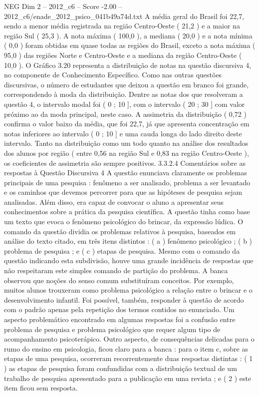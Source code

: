 \begin{textsample}{NEG Dim 2 – 2012\_c6 – Score -2.00 – 2012\_c6/enade\_2012\_psico\_041b49a74d.txt}
A média geral do Brasil foi 22,7, sendo a menor média registrada na região Centro-Oeste ( 21,2 ) e a maior na região Sul ( 25,3 ).
A nota máxima ( 100,0 ), a mediana ( 20,0 ) e a nota mínima ( 0,0 ) foram obtidas em quase todas as regiões do Brasil, exceto a nota máxima ( 95,0 ) das regiões Norte e Centro-Oeste e a mediana da região Centro-Oeste ( 10,0 ).
O Gráfico 3.20 representa a distribuição de notas na questão discursiva 4, no componente de Conhecimento Específico.
Como nas outras questões discursivas, o número de estudantes que deixou a questão em branco foi grande, correspondendo à moda da distribuição.
Dentre as notas dos que resolveram a questão 4, o intervalo modal foi ( 0 ; 10 ], com o intervalo ( 20 ; 30 ] com valor próximo ao da moda principal, neste caso.
A assimetria da distribuição ( 0,72 ) confirma o valor baixo da média, que foi 22,7, já que apresenta concentração em notas inferiores ao intervalo ( 0 ; 10 ] e uma cauda longa do lado direito deste intervalo.
Tanto na distribuição como um todo quanto na análise dos resultados dos alunos por região ( entre 0,56 na região Sul e 0,83 na região Centro-Oeste ), os coeficientes de assimetria são sempre positivos. 3.3.2.4 Comentários sobre as respostas à Questão Discursiva 4 A questão enunciava claramente os problemas principais de uma pesquisa : fenômeno a ser analisado, problema a ser levantado e os caminhos que devemos percorrer para que as hipóteses de pesquisa sejam analisadas.
Além disso, era capaz de convocar o aluno a apresentar seus conhecimentos sobre a prática da pesquisa científica.
A questão tinha como base um texto que evoca o fenômeno psicológico do brincar, da expressão lúdica.
O comando da questão dividia os problemas relativos à pesquisa, baseados em análise do texto citado, em três itens distintos : ( a ) fenômeno psicológico ; ( b ) problema de pesquisa ; e ( c ) etapas de pesquisa.
Mesmo com o comando da questão indicando esta subdivisão, houve uma grande incidência de respostas que não respeitaram este simples comando de partição do problema.
A banca observou que noções do senso comum substituíram conceitos.
Por exemplo, muitos alunos trouxeram como problema psicológico a relação entre o brincar e o desenvolvimento infantil.
Foi possível, também, responder à questão de acordo com o padrão apenas pela repetição dos termos contidos no enunciado.
Um aspecto problemático encontrado em algumas respostas foi a confusão entre problema de pesquisa e problema psicológico que requer algum tipo de acompanhamento psicoterápico.
Outro aspecto, de consequências delicadas para o rumo do ensino em psicologia, ficou claro para a banca : para o item c, sobre as etapas de uma pesquisa, ocorreram recorrentemente duas respostas distintas : ( 1 ) as etapas de pesquisa foram confundidas com a distribuição textual de um trabalho de pesquisa apresentado para a publicação em uma revista ; e ( 2 ) este item ficou sem resposta.

\end{textsample}

